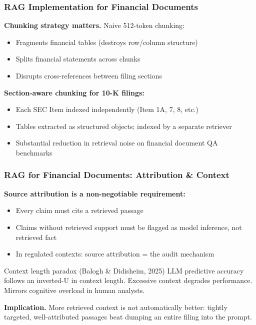 \documentclass[9pt,t]{beamer}
\begin{document}
\begin{frame}
\frametitle{RAG Implementation for Financial Documents}

\textbf{Chunking strategy matters.} Naive 512-token chunking:
\begin{itemize}
  \item Fragments financial tables (destroys row/column structure)
  \item Splits financial statements across chunks
  \item Disrupts cross-references between filing sections
\end{itemize}

\textbf{Section-aware chunking for 10-K filings:}
\begin{itemize}
  \item Each SEC Item indexed independently (Item 1A, 7, 8, etc.)
  \item Tables extracted as structured objects; indexed by a separate retriever
  \item Substantial reduction in retrieval noise on financial document QA benchmarks
\end{itemize}
\end{frame}

\begin{frame}
\frametitle{RAG for Financial Documents: Attribution \& Context}

\textbf{Source attribution is a non-negotiable requirement:}
\begin{itemize}
  \item Every claim must cite a retrieved passage
  \item Claims without retrieved support must be flagged as model inference, not retrieved fact
  \item In regulated contexts: source attribution = the audit mechanism
\end{itemize}

\medskip
\begin{block}{Context length paradox (Balogh \& Didisheim, 2025)}
  LLM predictive accuracy follows an inverted-U in context length.
  Excessive context degrades performance. Mirrors cognitive overload in human analysts.
\end{block}

\medskip
\textbf{Implication.} More retrieved context is not automatically better:
tightly targeted, well-attributed passages beat dumping an entire filing into
the prompt.
\end{frame}
\end{document}
